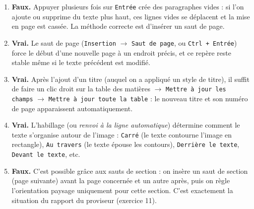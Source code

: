 \documentclass[11pt]{article}
\newcommand{\cle}[1]{{\popxbold\color{popdark}#1}}
\begin{document}
\begin{corrige}
\begin{enumerate}
\item \textbf{Faux.} Appuyer plusieurs fois sur \texttt{Entrée} crée des paragraphes vides : si l'on ajoute ou supprime du texte plus haut, ces lignes vides se déplacent et la mise en page est cassée. La méthode correcte est d'insérer un \cle{saut de page}.
\item \textbf{Vrai.} Le saut de page (\texttt{Insertion} $\to$ \texttt{Saut de page}, ou \texttt{Ctrl + Entrée}) force le début d'une nouvelle page à un endroit précis, et ce repère reste stable même si le texte précédent est modifié.
\item \textbf{Vrai.} Après l'ajout d'un titre (auquel on a appliqué un style de titre), il suffit de faire un clic droit sur la table des matières $\to$ \texttt{Mettre à jour les champs} $\to$ \texttt{Mettre à jour toute la table} : le nouveau titre et son numéro de page apparaissent automatiquement.
\item \textbf{Vrai.} L'\cle{habillage} (ou \emph{renvoi à la ligne automatique}) détermine comment le texte s'organise autour de l'image : \texttt{Carré} (le texte contourne l'image en rectangle), \texttt{Au travers} (le texte épouse les contours), \texttt{Derrière le texte}, \texttt{Devant le texte}, etc.
\item \textbf{Faux.} C'est possible grâce aux \cle{sauts de section} : on insère un saut de section (page suivante) avant la page concernée et un autre après, puis on règle l'orientation paysage uniquement pour cette section. C'est exactement la situation du rapport du proviseur (exercice 11).
\end{enumerate}
\end{corrige}
\end{document}
